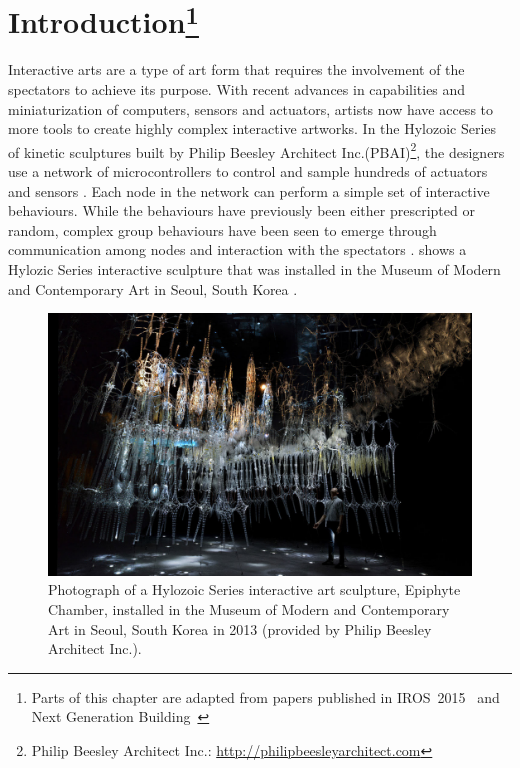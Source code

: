 \chapter[Introduction]{Introduction\footnote{Parts of this chapter are adapted from papers published in IROS~2015~\cite{Chan2015} and Next Generation \mbox{Building}~\cite{Gorbet2015}}} 
\label{chap:intro}

Interactive arts are a type of art form that requires the involvement of the spectators to achieve its purpose. With recent advances in capabilities and miniaturization of computers, sensors and actuators, artists now have access to more tools to create highly complex interactive artworks. In the Hylozoic Series of kinetic sculptures built by Philip Beesley Architect Inc.(PBAI)\footnote{Philip Beesley Architect Inc.: \url{http://philipbeesleyarchitect.com}}, the designers use a network of microcontrollers to control and sample hundreds of actuators and sensors \cite{Beesley2010}\cite{Beesley2010-1}. Each node in the network can perform a simple set of interactive behaviours. While the behaviours have previously been either prescripted or random, complex group behaviours have been seen to emerge through communication among nodes and interaction with the spectators \cite{Beesley2012}.  shows a Hylozic Series interactive sculpture that was installed in the Museum of Modern and Contemporary Art in Seoul, South Korea \cite{PBAISeoul2013}. 

\begin{figure} [!htb]
	\centering
	\includegraphics[width=1.0 \textwidth]{"fig/introduction/PBAI_09"}
	\caption[Photograph of a Hylozoic Series interactive art sculpture, Epiphyte Chamber]{Photograph of a Hylozoic Series interactive art sculpture, Epiphyte Chamber, installed in the Museum of Modern and Contemporary Art in Seoul, South Korea in 2013 (provided by Philip Beesley Architect Inc.).}
	\label{fig:other-sculpture-photo}
\end{figure}

